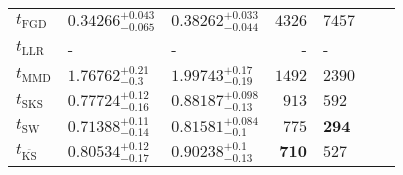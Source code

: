 \begin{tabular}{l|llr|llr}
	\midrule
	$t_{\mathrm{FGD}}$ & ${\mathbf{0.34266_{-0.065}^{+0.043}}}$ & ${\mathbf{0.38262_{-0.044}^{+0.033}}}$ & $4326$ & $7457$ \\
	$t_{\mathrm{LLR}}$ & - & - & - & - \\
	$t_{\mathrm{MMD}}$ & $1.76762_{-0.3}^{+0.21}$ & $1.99743_{-0.19}^{+0.17}$ & $1492$ & $2390$ \\
	$t_{\mathrm{SKS}}$ & $0.77724_{-0.16}^{+0.12}$ & $0.88187_{-0.13}^{+0.098}$ & $913$ & $592$ \\
	$t_{\mathrm{SW}}$ & $0.71388_{-0.14}^{+0.11}$ & $0.81581_{-0.1}^{+0.084}$ & $775$ & ${\mathbf{294}}$ \\
	$t_{\overline{\mathrm{KS}}}$ & $0.80534_{-0.17}^{+0.12}$ & $0.90238_{-0.13}^{+0.1}$ & ${\mathbf{710}}$ & $527$ \\
	\bottomrule
\end{tabular}